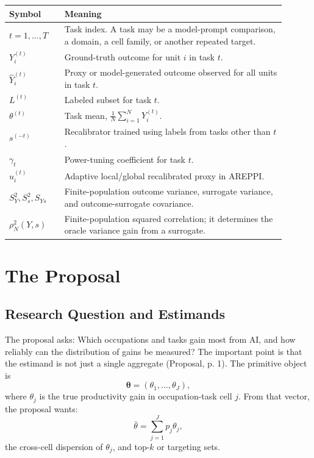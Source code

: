 \documentclass[11pt]{article}
\newcommand{\thetav}{\boldsymbol{\theta}}
\begin{document}
\begin{center}
\begin{tabular}{>{\raggedright\arraybackslash}p{0.18\linewidth}p{0.72\linewidth}}
\toprule
Symbol & Meaning \\
\midrule
$t=1,\ldots,T$ & Task index. A task may be a model-prompt comparison, a domain, a cell family, or another repeated target. \\
$Y_i^{(t)}$ & Ground-truth outcome for unit $i$ in task $t$. \\
$\widehat Y_i^{(t)}$ & Proxy or model-generated outcome observed for all units in task $t$. \\
$L^{(t)}$ & Labeled subset for task $t$. \\
$\theta^{(t)}$ & Task mean, $\frac{1}{N}\sum_{i=1}^N Y_i^{(t)}$. \\
$s^{(-t)}$ & Recalibrator trained using labels from tasks other than $t$. \\
$\gamma_t$ & Power-tuning coefficient for task $t$. \\
$u_i^{(t)}$ & Adaptive local/global recalibrated proxy in AREPPI. \\
$S_Y^2,S_s^2,S_{Ys}$ & Finite-population outcome variance, surrogate variance, and outcome-surrogate covariance. \\
$\rho_N^2(Y,s)$ & Finite-population squared correlation; it determines the oracle variance gain from a surrogate. \\
\bottomrule
\end{tabular}
\end{center}

\section{The Proposal}

\subsection{Research Question and Estimands}

The proposal asks: Which occupations and tasks gain most from AI, and how reliably can the distribution of gains be measured? The important point is that the estimand is not just a single aggregate (Proposal, p. 1). The primitive object is
\[
  \thetav=(\theta_1,\ldots,\theta_J),
\]
where $\theta_j$ is the true productivity gain in occupation-task cell $j$. From that vector, the proposal wants:
\[
  \bar\theta=\sum_{j=1}^J p_j\theta_j,
\]
the cross-cell dispersion of $\theta_j$, and top-$k$ or targeting sets.
\end{document}
